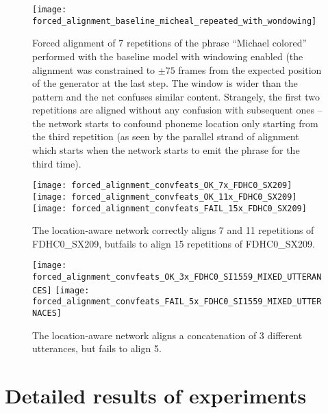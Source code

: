 \documentclass{article}
\begin{document}
\begin{sidewaysfigure}[h]
  \texttt{[image: forced\_alignment\_baseline\_micheal\_repeated\_with\_wondowing]}
  \caption{Forced alignment of 7 repetitions of the phrase ``Michael
    colored'' performed with the baseline model with windowing enabled
  (the alignment was constrained to $\pm 75$ frames from the expected
  position of the generator at the last step. The window is wider than
the pattern and the net confuses similar content. Strangely, the first
two repetitions are aligned without any confusion with subsequent ones --
the network starts to confound phoneme location only starting from the
third repetition (as seen by the parallel strand of alignment which
starts when the network starts to emit the phrase for the third time).
}
\end{sidewaysfigure}


\begin{sidewaysfigure}[h]
  \texttt{[image: forced\_alignment\_convfeats\_OK\_7x\_FDHC0\_SX209]}
  \texttt{[image: forced\_alignment\_convfeats\_OK\_11x\_FDHC0\_SX209]}
  \texttt{[image: forced\_alignment\_convfeats\_FAIL\_15x\_FDHC0\_SX209]}
  \caption{The location-aware network correctly aligns 7 and 11
    repetitions of FDHC0\_SX209, butfails to align 15 repetitions
    of FDHC0\_SX209.}
\end{sidewaysfigure}

\begin{sidewaysfigure}[h]
  \texttt{[image: forced\_alignment\_convfeats\_OK\_3x\_FDHC0\_SI1559\_MIXED\_UTTERANCES]}
  \texttt{[image: forced\_alignment\_convfeats\_FAIL\_5x\_FDHC0\_SI1559\_MIXED\_UTTERNACES]}
  \caption{The location-aware network aligns a concatenation of 3 different
    utterances, but fails to align 5.}
\end{sidewaysfigure}

\clearpage
\section{Detailed results of experiments}
\end{document}
